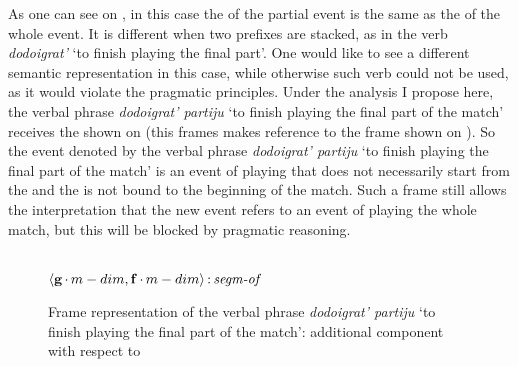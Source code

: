 As one can see on , in this case the  of the partial event is the same as the  of the whole event. It is different when two prefixes are stacked, as in the verb \textit{dodoigrat'} `to finish playing the final part'. One would like to see a different semantic representation in this case, while otherwise such verb could not be used, as it would violate the pragmatic principles. Under the analysis I propose here, the verbal phrase \textit{dodoigrat' partiju} `to finish playing the final part of the match' receives the  shown on  (this frames makes reference to the frame shown on ). So the event denoted by the verbal phrase \textit{dodoigrat' partiju} `to finish playing the final part of the match' is an event of playing that does not necessarily start from the  and the  is not bound to the beginning of the match. Such a frame still allows the interpretation that the new event refers to an event of playing the whole match, but this will be blocked by pragmatic reasoning.

\begin{figure}
\\
$\langle{\textbf{\textrm{g}}\,{\cdot}\,m-dim,\textbf{\textrm{f}}\,{\cdot}\,m-dim}\rangle\,{:}\,\textit{segm-of}$\\[1ex]
\caption{Frame representation of the verbal phrase \textit{dodoigrat' partiju} `to finish playing the final part of the match': additional component with respect to  \label{frame:do:do:igrat:partiju}}
\end{figure}

